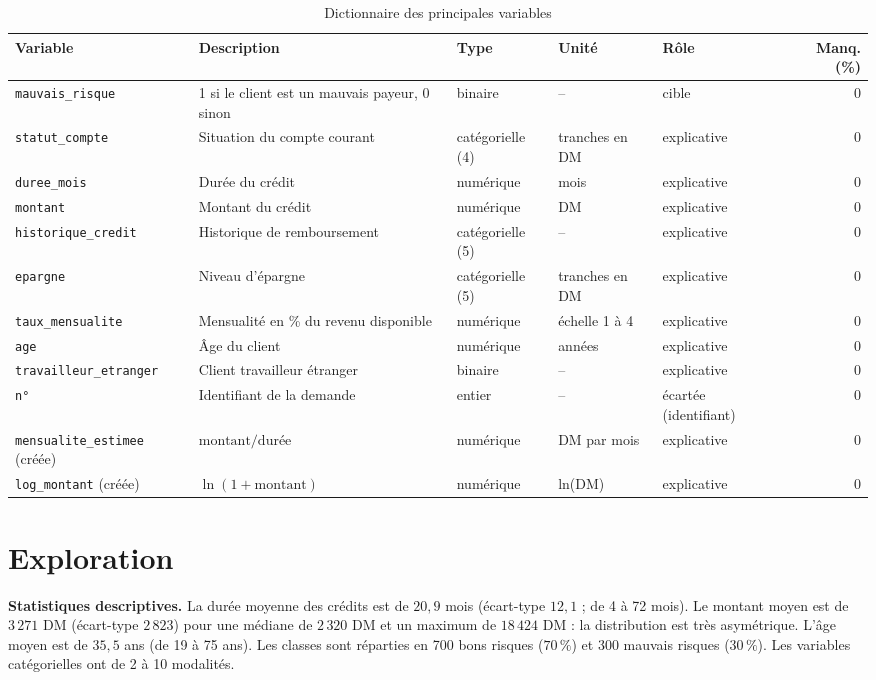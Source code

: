 \documentclass[12pt,a4paper]{article}
\begin{document}
\begin{table}[H]
\centering\small
\caption{Dictionnaire des principales variables}
\footnotesize
\begin{tabularx}{\linewidth}{@{}>{\raggedright\arraybackslash}p{3.5cm}Y>{\raggedright\arraybackslash}p{2.2cm}>{\raggedright\arraybackslash}p{2.1cm}>{\raggedright\arraybackslash}p{1.9cm}r@{}}
\toprule
Variable & Description & Type & Unité & Rôle & Manq. (\%) \\
\midrule
\texttt{mauvais\_risque} & 1 si le client est un mauvais payeur, 0 sinon & binaire & -- & cible & 0 \\
\texttt{statut\_compte} & Situation du compte courant & catégorielle (4) & tranches en DM & explicative & 0 \\
\texttt{duree\_mois} & Durée du crédit & numérique & mois & explicative & 0 \\
\texttt{montant} & Montant du crédit & numérique & DM & explicative & 0 \\
\texttt{historique\_credit} & Historique de remboursement & catégorielle (5) & -- & explicative & 0 \\
\texttt{epargne} & Niveau d’épargne & catégorielle (5) & tranches en DM & explicative & 0 \\
\texttt{taux\_mensualite} & Mensualité en \% du revenu disponible & numérique & échelle 1 à 4 & explicative & 0 \\
\texttt{age} & Âge du client & numérique & années & explicative & 0 \\
\texttt{travailleur\_etranger} & Client travailleur étranger & binaire & -- & explicative & 0 \\
\texttt{n°} & Identifiant de la demande & entier & -- & écartée (identifiant) & 0 \\
\texttt{mensualite\_estimee} (créée) & $\text{montant}/\text{durée}$ & numérique & DM par mois & explicative & 0 \\
\texttt{log\_montant} (créée) & $\ln(1+\text{montant})$ & numérique & ln(DM) & explicative & 0 \\
\bottomrule
\end{tabularx}
\end{table}

\section{Exploration}\label{sec:expl}
\textbf{Statistiques descriptives.} La durée moyenne des crédits est de $20{,}9$ mois (écart-type $12{,}1$ ; de 4 à 72 mois). Le montant moyen est de $3\,271$ DM (écart-type $2\,823$) pour une médiane de $2\,320$ DM et un maximum de $18\,424$ DM : la distribution est très asymétrique. L’âge moyen est de $35{,}5$ ans (de 19 à 75 ans). Les classes sont réparties en 700 bons risques ($70\,\%$) et 300 mauvais risques ($30\,\%$). Les variables catégorielles ont de 2 à 10 modalités.
\end{document}
